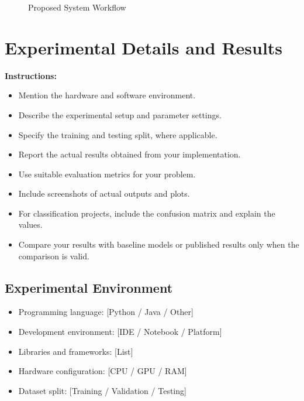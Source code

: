 \documentclass[12pt,a4paper]{report}
\begin{document}

\begin{figure}[H]
\centering
{}
\caption{Proposed System Workflow}
\label{fig:workflow}
\end{figure}

\chapter{Experimental Details and Results}

\textbf{Instructions:}
\begin{itemize}
    \item Mention the hardware and software environment.
    \item Describe the experimental setup and parameter settings.
    \item Specify the training and testing split, where applicable.
    \item Report the actual results obtained from your implementation.
    \item Use suitable evaluation metrics for your problem.
    \item Include screenshots of actual outputs and plots.
    \item For classification projects, include the confusion matrix
    and explain the values.
    \item Compare your results with baseline models or published
    results only when the comparison is valid.
\end{itemize}

\section{Experimental Environment}

\begin{itemize}
    \item Programming language: [Python / Java / Other]
    \item Development environment: [IDE / Notebook / Platform]
    \item Libraries and frameworks: [List]
    \item Hardware configuration: [CPU / GPU / RAM]
    \item Dataset split: [Training / Validation / Testing]
\end{itemize}
\end{document}
